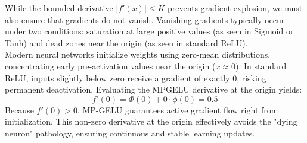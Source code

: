 \documentclass[11pt]{article}
\begin{document}
\vspace{0.5cm}

\noindent While the bounded derivative $|f'(x)| \le K$ prevents gradient explosion, we must also ensure that gradients do not vanish. Vanishing gradients typically occur under two conditions: saturation at large positive values (as seen in Sigmoid or Tanh) and dead zones near the origin (as seen in standard ReLU).\\

\noindent Modern neural networks initialize weights using zero-mean distributions, concentrating early pre-activation values near the origin ($x \approx 0$). In standard ReLU, inputs slightly below zero receive a gradient of exactly $0$, risking permanent deactivation. Evaluating the MPGELU derivative at the origin yields:
\begin{equation*}
f'(0) = \Phi(0) + 0 \cdot \phi(0) = 0.5
\end{equation*}
\noindent Because $f'(0) > 0$, MP-GELU guarantees active gradient flow right from initialization. This non-zero derivative at the origin effectively avoids the "dying neuron" pathology, ensuring continuous and stable learning updates.




\end{document}
